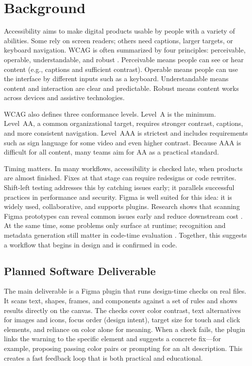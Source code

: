 \documentclass[12pt]{article}
\begin{document}
\section{Background}
Accessibility aims to make digital products usable by people with a variety of abilities. Some rely on screen readers; others need captions, larger targets, or keyboard navigation. WCAG is often summarized by four principles: perceivable, operable, understandable, and robust \cite{wcag2023}. Perceivable means people can see or hear content (e.g., captions and sufficient contrast). Operable means people can use the interface by different inputs such as a keyboard. Understandable means content and interaction are clear and predictable. Robust means content works across devices and assistive technologies.

WCAG also defines three conformance levels. Level~A is the minimum. Level~AA, a common organizational target, requires stronger contrast, captions, and more consistent navigation. Level~AAA is strictest and includes requirements such as sign language for some video and even higher contrast. Because AAA is difficult for all content, many teams aim for AA as a practical standard.

Timing matters. In many workflows, accessibility is checked late, when products are almost finished. Fixes at that stage can require redesigns or code rewrites. Shift-left testing addresses this by catching issues early; it parallels successful practices in performance and security. Figma is well suited for this idea: it is widely used, collaborative, and supports plugins. Research shows that scanning Figma prototypes can reveal common issues early and reduce downstream cost \cite{huang2024a11yfigma, chen2024figmaapps}. At the same time, some problems only surface at runtime; recognition and metadata generation still matter in code-time evaluation \cite{zhang2021screenrecognition}. Together, this suggests a workflow that begins in design and is confirmed in code.

\subsection*{Planned Software Deliverable}
The main deliverable is a Figma plugin that runs design-time checks on real files. It scans text, shapes, frames, and components against a set of rules and shows results directly on the canvas. The checks cover color contrast, text alternatives for images and icons, focus order (design intent), target size for touch and click elements, and reliance on color alone for meaning. When a check fails, the plugin links the warning to the specific element and suggests a concrete fix—for example, proposing passing color pairs or prompting for an alt description. This creates a fast feedback loop that is both practical and educational.
\end{document}
